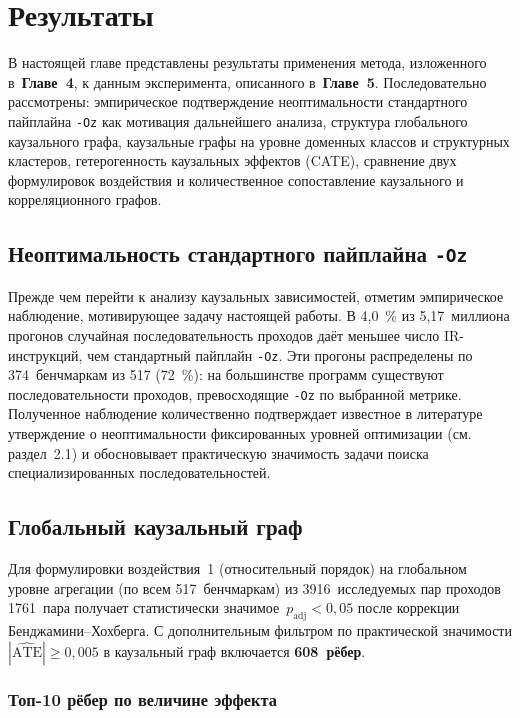 \section{Результаты}

В настоящей главе представлены результаты применения метода, изложенного в~\textbf{Главе~4}, к данным эксперимента, описанного в~\textbf{Главе~5}. Последовательно рассмотрены: эмпирическое подтверждение неоптимальности стандартного пайплайна \texttt{-Oz} как мотивация дальнейшего анализа, структура глобального каузального графа, каузальные графы на уровне доменных классов и структурных кластеров, гетерогенность каузальных эффектов (CATE), сравнение двух формулировок воздействия и количественное сопоставление каузального и корреляционного графов.

\subsection{Неоптимальность стандартного пайплайна \texttt{-Oz}}

Прежде чем перейти к анализу каузальных зависимостей, отметим эмпирическое наблюдение, мотивирующее задачу настоящей работы. В 4{,}0~\% из 5{,}17~миллиона прогонов случайная последовательность проходов даёт меньшее число IR-инструкций, чем стандартный пайплайн \texttt{-Oz}. Эти прогоны распределены по 374~бенчмаркам из 517 (72~\%): на большинстве программ существуют последовательности проходов, превосходящие \texttt{-Oz} по выбранной метрике. Полученное наблюдение количественно подтверждает известное в литературе утверждение о неоптимальности фиксированных уровней оптимизации (см. раздел~2.1) и обосновывает практическую значимость задачи поиска специализированных последовательностей.

\subsection{Глобальный каузальный граф}

Для формулировки воздействия~1 (относительный порядок) на глобальном уровне агрегации (по всем 517~бенчмаркам) из 3916~исследуемых пар проходов 1761~пара получает статистически значимое~$p_{\text{adj}} < 0{,}05$ после коррекции Бенджамини--Хохберга. С дополнительным фильтром по практической значимости $|\widehat{\text{ATE}}| \geqslant 0{,}005$ в каузальный граф включается \textbf{608~рёбер}.

\subsubsection{Топ-10 рёбер по величине эффекта}

